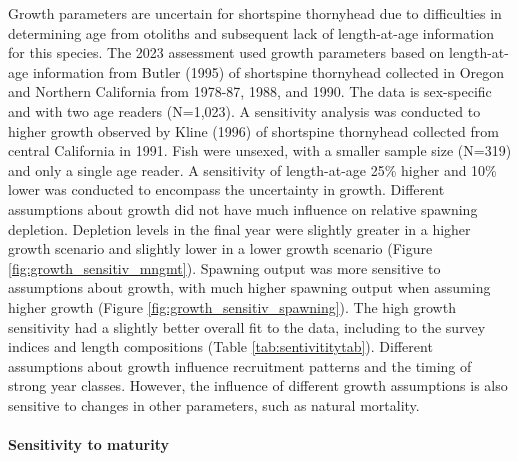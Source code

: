 \documentclass[11pt,
  english,
  letterpaper,
]{article}
\begin{document}
Growth parameters are uncertain for shortspine thornyhead due to difficulties in determining age from otoliths and subsequent lack of length-at-age information for this species. The 2023 assessment used growth parameters based on length-at-age information from Butler (1995) of shortspine thornyhead collected in Oregon and Northern California from 1978-87, 1988, and 1990. The data is sex-specific and with two age readers (N=1,023). A sensitivity analysis was conducted to higher growth observed by Kline (1996) of shortspine thornyhead collected from central California in 1991. Fish were unsexed, with a smaller sample size (N=319) and only a single age reader. A sensitivity of length-at-age 25\% higher and 10\% lower was conducted to encompass the uncertainty in growth. Different assumptions about growth did not have much influence on relative spawning depletion. Depletion levels in the final year were slightly greater in a higher growth scenario and slightly lower in a lower growth scenario (Figure \ref{fig:growth_sensitiv_mngmt}). Spawning output was more sensitive to assumptions about growth, with much higher spawning output when assuming higher growth (Figure \ref{fig:growth_sensitiv_spawning}). The high growth sensitivity had a slightly better overall fit to the data, including to the survey indices and length compositions (Table \ref{tab:sentivititytab}). Different assumptions about growth influence recruitment patterns and the timing of strong year classes. However, the influence of different growth assumptions is also sensitive to changes in other parameters, such as natural mortality.

\hypertarget{sensitivity-to-maturity}{%
\paragraph{Sensitivity to maturity}\label{sensitivity-to-maturity}}
\end{document}
